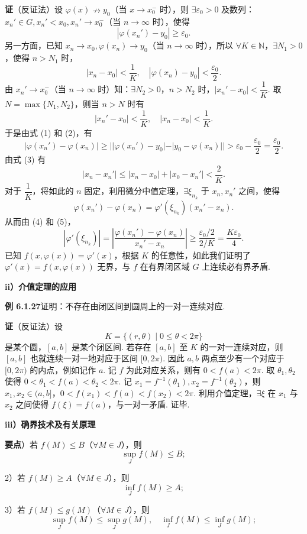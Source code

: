\documentclass[UTF8, 12pt, fontset=fandol, oneside]{ctexart}
\begin{document}
\noindent\textbf{证}\quad （反证法）设 $\varphi(x)\nrightarrow y_0$（当 $x\to x_0^-$ 时），则 $\exists\varepsilon_0>0$ 及数列：$x_n'\in G,x_n'<x_0,x_n'\to x_0^-$（当 $n\to\infty$ 时），使得
\[
  |\varphi(x_n')-y_0|\ge\varepsilon_0. \tag{1}
\]
另一方面，已知 $x_n\to x_0,\varphi(x_n)\to y_0$（当 $n\to\infty$ 时），所以 $\forall K\in\mathbb{N}$，$\exists N_1>0$，使得 $n>N_1$ 时，
\[
  |x_n-x_0|<\frac1K,\quad
  |\varphi(x_n)-y_0|<\frac{\varepsilon_0}{2}. \tag{2}
\]
由 $x_n'\to x_0^-$（当 $n\to\infty$ 时）知：$\exists N_2>0$，$n>N_2$ 时，$|x_n'-x_0|<\dfrac1K$. 取 $N=\max\{N_1,N_2\}$，则当 $n>N$ 时有
\[
  |x_n'-x_0|<\frac1K,\quad |x_n-x_0|<\frac1K. \tag{3}
\]
于是由式 (1) 和 (2)，有
\[
  |\varphi(x_n')-\varphi(x_n)|
  \ge ||\varphi(x_n')-y_0|-|y_0-\varphi(x_n)||>\varepsilon_0-\frac{\varepsilon_0}{2}
  =\frac{\varepsilon_0}{2}. \tag{4}
\]
由式 (3) 有
\[
  |x_n-x_n'|\le |x_n-x_0|+|x_0-x_n'|<\frac2K. \tag{5}
\]
对于 $\dfrac1K$，将如此的 $n$ 固定，利用微分中值定理，$\exists\xi_{n_k}$ 于 $x_n,x_n'$ 之间，使得
\[
  \varphi(x_n')-\varphi(x_n)=\varphi'(\xi_{n_k})(x_n'-x_n).
\]
从而由 (4) 和 (5)，
\[
  |\varphi'(\xi_{n_k})|
  =\left|\frac{\varphi(x_n')-\varphi(x_n)}{x_n'-x_n}\right|
  \ge \frac{\varepsilon_0/2}{2/K}
  =\frac{K\varepsilon_0}{4}.
\]
已知 $f(x,\varphi(x))=\varphi'(x)$，根据 $K$ 的任意性，如此我们证明了 $\varphi'(x)=f(x,\varphi(x))$ 无界，与 $f$ 在有界闭区域 $G$ 上连续必有界矛盾.

\noindent\textbf{ii）介值定理的应用}

\noindent\textbf{例 6.1.27}\quad 证明：不存在由闭区间到圆周上的一对一连续对应.

\noindent\textbf{证}\quad （反证法）设
\[
  K=\{(r,\theta)\mid 0\le\theta<2\pi\}
\]
是某个圆，$[a,b]$ 是某个闭区间. 若存在 $[a,b]$ 至 $K$ 的一对一连续对应，则 $[a,b]$ 也就连续一对一地对应于区间 $[0,2\pi)$. 因此 $a,b$ 两点至少有一个对应于 $[0,2\pi)$ 的内点，例如记作 $a$. 记 $f$ 为此对应关系，则有 $0<f(a)<2\pi$. 取 $\theta_1,\theta_2$ 使得 $0<\theta_1<f(a)<\theta_2<2\pi$. 记 $x_1=f^{-1}(\theta_1),x_2=f^{-1}(\theta_2)$，则 $x_1,x_2\in(a,b]$，$0<f(x_1)<f(a)<f(x_2)<2\pi$. 利用介值定理，$\exists\xi$ 在 $x_1$ 与 $x_2$ 之间使得 $f(\xi)=f(a)$，与一对一矛盾. 证毕.

\noindent\textbf{iii）确界技术及有关原理}

\noindent\textbf{要点}）若 $f(M)\le B$（$\forall M\in J$），则
\[
  \sup_J f(M)\le B;
\]

2）若 $f(M)\ge A$（$\forall M\in J$），则
\[
  \inf_J f(M)\ge A;
\]

3）若 $f(M)\le g(M)$（$\forall M\in J$），则
\[
  \sup_J f(M)\le \sup_J g(M),\quad
  \inf_J f(M)\le \inf_J g(M);
\]
\end{document}
